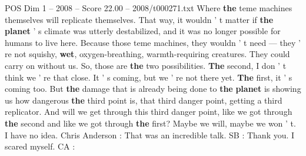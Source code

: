 \begin{textsample}{POS Dim 1 – 2008 – Score 22.00 – 2008/t000271.txt}
Where \textbf{the} teme machines themselves will replicate themselves.
That way, it wouldn ' t matter if \textbf{the} \textbf{planet} ' s climate was utterly destabilized, and it was no longer possible for humans to live here.
Because those teme machines, they wouldn ' t need — they ' re not squishy, \textbf{wet}, oxygen-breathing, warmth-requiring creatures.
They could carry on without us.
So, those are \textbf{the} two possibilities. \textbf{The} second, I don ' t think we ' re that close.
It ' s coming, but we ' re not there yet. \textbf{The} first, it ' s coming too.
But \textbf{the} damage that is already being done to \textbf{the} \textbf{planet} is showing us how dangerous \textbf{the} third point is, that third danger point, getting a third replicator.
And will we get through this third danger point, like we got through \textbf{the} second and like we got through \textbf{the} first?
Maybe we will, maybe we won ' t.
I have no idea.
Chris Anderson : That was an incredible talk.
SB : Thank you.
I scared myself.
CA :

\end{textsample}
